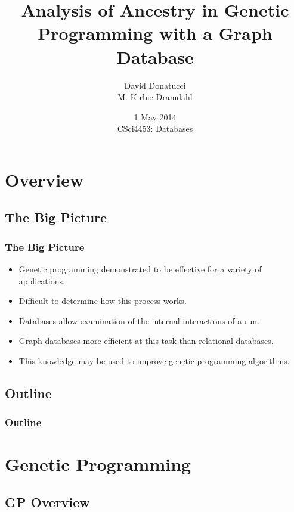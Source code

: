 \documentclass{beamer}
\title[Analysis of GP Ancestry in Neo4j]{Analysis of Ancestry in Genetic Programming with a Graph Database}
\author[Donatucci, Dramdahl]{David Donatucci \\ M. Kirbie Dramdahl}
\date[May '14, CSci4453] %
{1 May 2014 \\ CSci4453: Databases}
\begin{document}
\begin{frame}
  \titlepage
\end{frame}


\section*{Overview}

\subsection*{The Big Picture}

\begin{frame}
  \frametitle{The Big Picture}
  
  \begin{itemize}
	\item Genetic programming demonstrated to be effective for a variety of applications.
	\item Difficult to determine how this process works.
	\item Databases allow examination of the internal interactions of a run.
	\item Graph databases more efficient at this task than relational databases.
	\item This knowledge may be used to improve genetic programming algorithms.
  \end{itemize}

  
\end{frame}

\subsection*{Outline}

\begin{frame}
  \frametitle{Outline}
  \tableofcontents[hideallsubsections]
\end{frame}

\section[Genetic Programming]{Genetic Programming}

\subsection{GP Overview}
\end{document}
